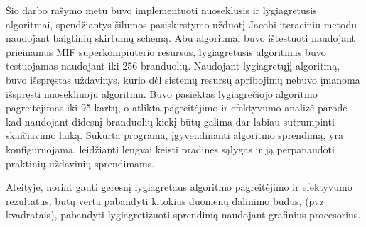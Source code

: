 \documentclass{VUMIFPSbakalaurinis}
\begin{document}




Šio darbo rašymo metu buvo implementuoti nuoseklusis ir lygiagretusis algoritmai, spendžiantys šilumos pasiskirstymo užduotį Jacobi iteraciniu metodu naudojant baigtinių skirtumų schemą.
Abu algoritmai buvo ištestuoti naudojant prieinamus MIF superkompiuterio resursus, lygiagretusis algoritmas buvo testuojamas naudojant iki 256 branduolių.
Naudojant lygiagretųjį algoritmą, buvo išspręstas uždavinys, kurio dėl sistemų resursų apribojimų nebuvo įmanoma išspręsti nuosekliuoju algoritmu. 
Buvo pasiektas lygiagrečiojo algoritmo pagreitėjimas iki 95 kartų, o atlikta pagreitėjimo ir efektyvumo analizė parodė kad naudojant didesnį branduolių kiekį būtų galima dar labiau sutrumpinti skaičiavimo laiką.
Sukurta programa, įgyvendinanti algoritmo sprendimą, yra konfiguruojama, leidžianti lengvai keisti pradines sąlygas ir ją perpanaudoti praktinių uždavinių sprendimams.

Ateityje, norint gauti geresnį lygiagretaus algoritmo pagreitėjimo ir efektyvumo rezultatus, būtų verta pabandyti kitokius duomenų dalinimo būdus, (pvz kvadratais), pabandyti lygiagretizuoti sprendimą naudojant grafinius procesorius.
\end{document}
